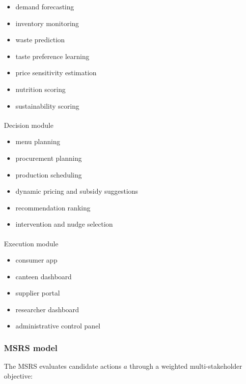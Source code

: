 \documentclass[
  letterpaper,
  DIV=11,
  numbers=noendperiod]{scrartcl}
\makeatletter
\let\oldparagraph\paragraph
\renewcommand{\paragraph}{
    \@ifstar
      \xxxParagraphStar
      \xxxParagraphNoStar
  }
\newcommand{\xxxParagraphStar}[1]{\oldparagraph*{#1}\mbox{}}
\newcommand{\xxxParagraphNoStar}[1]{\oldparagraph{#1}\mbox{}}
\providecommand{\tightlist}{%
  \setlength{\itemsep}{0pt}\setlength{\parskip}{0pt}}
\makeatother
\begin{document}
\begin{itemize}
\tightlist
\item
  demand forecasting
\item
  inventory monitoring
\item
  waste prediction
\item
  taste preference learning
\item
  price sensitivity estimation
\item
  nutrition scoring
\item
  sustainability scoring
\end{itemize}

\paragraph{Decision module}\label{decision-module}

\begin{itemize}
\tightlist
\item
  menu planning
\item
  procurement planning
\item
  production scheduling
\item
  dynamic pricing and subsidy suggestions
\item
  recommendation ranking
\item
  intervention and nudge selection
\end{itemize}

\paragraph{Execution module}\label{execution-module}

\begin{itemize}
\tightlist
\item
  consumer app
\item
  canteen dashboard
\item
  supplier portal
\item
  researcher dashboard
\item
  administrative control panel
\end{itemize}

\subsubsection{MSRS model}\label{msrs-model}

The MSRS evaluates candidate actions \(a\) through a weighted
multi-stakeholder objective:
\end{document}
